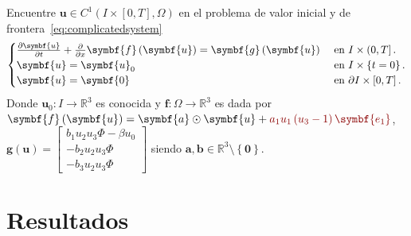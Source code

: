 Encuentre
\begin{math}
	\symbf{u}\in
	C^{1}\left(I\times\left[0,T\right],\Omega\right)
\end{math}
en el problema de valor inicial y de frontera~\eqref{eq:complicatedsystem}
\begin{equation}\label{eq:complicatedsystem}
	\begin{cases}
		\diffp{\symbf{u}}{t}+\diffp{}{x}\symbf{f}\left(\symbf{u}\right)=
		\symbf{g}\left(\symbf{u}\right) & \text{ en }I\times\left(0,T\right].          \\
		\symbf{u}                                                      =
		\symbf{u}_{0}                   & \text{ en }I\times\left\{t=0\right\}.        \\
		\symbf{u}                                                       =
		\symbf{0}                       & \text{ en }\partial I\times\left[0,T\right].
	\end{cases}
\end{equation}
Donde
\begin{math}
	\symbf{u}_{0}\colon I\to
	\mathbb{R}^{3}
\end{math}
es conocida y
\begin{math}
	\symbf{f}\colon\Omega\to
	\mathbb{R}^{3}
\end{math}
es dada por
\begin{math}
	\symbf{f}\left(\symbf{u}\right)=
	\symbf{a}\odot\symbf{u}+
	\mathcolor{DarkRed}{a_{1}u_{1}\left(u_{3}-1\right)\symbf{e_{1}}}
\end{math},
\begin{math}
	\symbf{g}\left(\symbf{u}\right)=
	\begin{bmatrix}
		b_{1}u_{2}u_{3}\Phi-\beta u_{0} \\
		-b_{2}u_{2}u_{3}\Phi            \\
		-b_{3}u_{2}u_{3}\Phi
	\end{bmatrix}
\end{math}
siendo $\symbf{a},\symbf{b}\in\mathbb{R}^{3}\setminus\left\{\symbf{0}\right\}$.

\chapter{Resultados}


